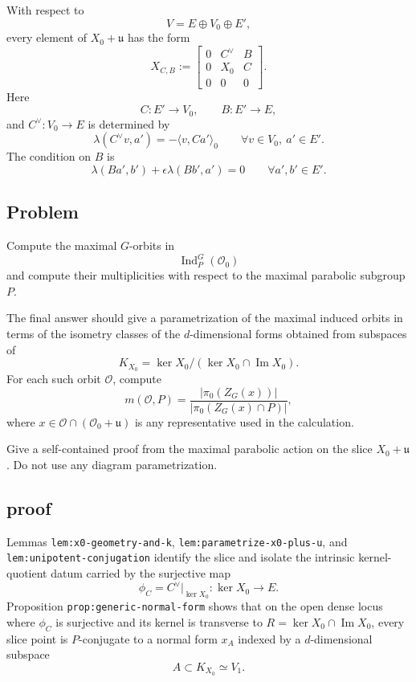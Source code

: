 \documentclass[
  11pt,
]{article}
\begin{document}
With respect to \[
V=E\oplus V_0\oplus E',
\] every element of \(X_0+\mathfrak u\) has the form \[
X_{C,B}:=
\begin{bmatrix}
0&C^\vee&B\\
0&X_0&C\\
0&0&0
\end{bmatrix}.
\] Here \[
C:E'\to V_0,
\qquad
B:E'\to E,
\] and \(C^\vee:V_0\to E\) is determined by \[
\lambda(C^\vee v,a')=-\langle v,Ca'\rangle_0
\qquad \forall v\in V_0,\ a'\in E'.
\] The condition on \(B\) is \[
\lambda(Ba',b')+\epsilon\lambda(Bb',a')=0
\qquad \forall a',b'\in E'.
\]

\subsection{Problem}\label{problem}

Compute the maximal \(G\)-orbits in \[
\operatorname{Ind}_P^G(\mathcal O_0)
\] and compute their multiplicities with respect to the maximal
parabolic subgroup \(P\).

The final answer should give a parametrization of the maximal induced
orbits in terms of the isometry classes of the \(d\)-dimensional forms
obtained from subspaces of \[
K_{X_0}=\ker X_0/(\ker X_0\cap\operatorname{Im}X_0).
\] For each such orbit \(\mathcal O\), compute \[
m(\mathcal O,P)
=
\frac{|\pi_0(Z_G(x))|}
{|\pi_0(Z_G(x)\cap P)|},
\] where \(x\in\mathcal O\cap(\mathcal O_0+\mathfrak u)\) is any
representative used in the calculation.

Give a self-contained proof from the maximal parabolic action on the
slice \(X_0+\mathfrak u\). Do not use any diagram parametrization.

\subsection{proof}\label{proof-8}

Lemmas \texttt{lem:x0-geometry-and-k},
\texttt{lem:parametrize-x0-plus-u}, and
\texttt{lem:unipotent-conjugation} identify the slice and isolate the
intrinsic kernel-quotient datum carried by the surjective map \[
\phi_C=C^\vee|_{\ker X_0}:\ker X_0\to E.
\] Proposition \texttt{prop:generic-normal-form} shows that on the open
dense locus where \(\phi_C\) is surjective and its kernel is transverse
to \(R=\ker X_0\cap \operatorname{Im} X_0\), every slice point is
\(P\)-conjugate to a normal form \(x_A\) indexed by a \(d\)-dimensional
subspace \[
A\subset K_{X_0}\simeq V_1.
\]
\end{document}
